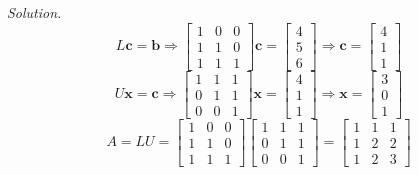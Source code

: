 \documentclass[12pt]{article}
\begin{document}
\begin{itemize}
\textit{Solution.}
\begin{equation*}
L\mathbf{c}=\mathbf{b} \Rightarrow 
\left[\begin{array}{ccc}
1 & 0 & 0 \\
1 & 1 & 0 \\
1 & 1 & 1 
\end{array}\right] \mathbf{c} = 
\left[\begin{array}{c}4 \\ 5 \\ 6 \end{array}\right] \Rightarrow \mathbf{c}=\left[\begin{array}{c}4 \\ 1 \\ 1 \end{array}\right]
\end{equation*}
\begin{equation*}
U\mathbf{x} = \mathbf{c} \Rightarrow
\left[\begin{array}{ccc}
1 & 1 & 1 \\
0 & 1 & 1 \\
0 & 0 & 1
\end{array}\right] \mathbf{x} = \left[\begin{array}{c}4 \\ 1 \\ 1 \end{array}\right] \Rightarrow \mathbf{x} = \left[\begin{array}{c}3 \\ 0 \\ 1 \end{array}\right]
\end{equation*}
\begin{equation*}
A=LU=
\left[\begin{array}{ccc}
1 & 0 & 0 \\
1 & 1 & 0 \\
1 & 1 & 1 
\end{array}\right]
\left[\begin{array}{ccc}
1 & 1 & 1 \\
0 & 1 & 1 \\
0 & 0 & 1
\end{array}\right] =
\left[\begin{array}{ccc}
1 & 1 & 1 \\
1 & 2 & 2 \\
1 & 2 & 3
\end{array}\right]
\end{equation*}


\end{itemize}
\end{document}
